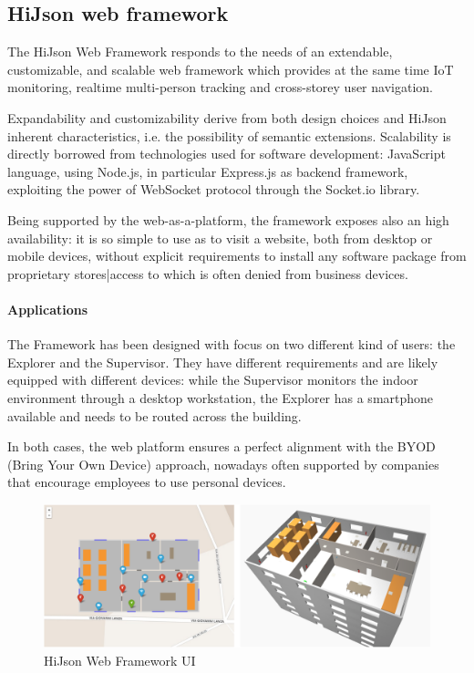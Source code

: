 \documentclass{sig-alternate}
\begin{document}
\subsection{HiJson web framework}

The HiJson Web Framework responds to the needs of an extendable, customizable, and scalable web framework which provides at the same time IoT monitoring, realtime multi-person tracking and cross-storey user navigation.

Expandability and customizability derive from both design choices and HiJson inherent characteristics, i.e. the possibility of semantic extensions. Scalability is directly borrowed from technologies used for software development: JavaScript language, using Node.js, in particular Express.js as backend framework, exploiting the power of WebSocket protocol through the Socket.io library.

Being supported by the web-as-a-platform, the framework exposes also an high availability: it is so simple to use as to visit a website, both from desktop or mobile devices, without explicit requirements to install any software package from proprietary stores|access to which is often denied from business devices.

\paragraph{Applications}

The Framework has been designed with focus on two different kind of users: the Explorer and the Supervisor. They have different requirements and are likely equipped with different devices: while the Supervisor monitors the indoor environment through a desktop workstation, the Explorer has a smartphone available and needs to be routed across the building.

In both cases, the web platform ensures a perfect alignment with the BYOD (Bring Your Own Device) approach, nowadays often supported by companies that encourage employees to use personal devices.


\begin{figure}[htb]
\centering
\includegraphics[width=\linewidth]{../images/2D-3D}
\caption{HiJson Web Framework UI}
\label{fig:web-framework-ui}
\end{figure}
\end{document}

